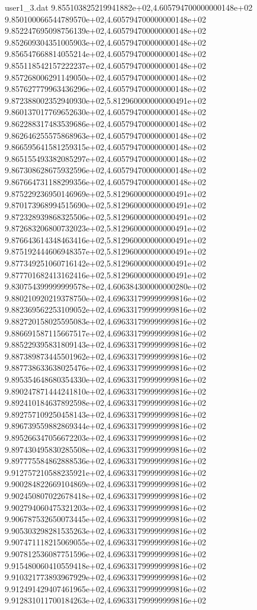 \begin{filecontents}{user1_3.dat}
9.855103825219941882e+02,4.605794700000000148e+02
9.850100066544789570e+02,4.605794700000000148e+02
9.852247695098756139e+02,4.605794700000000148e+02
9.852609304351005903e+02,4.605794700000000148e+02
9.856547668814055214e+02,4.605794700000000148e+02
9.855118542157222237e+02,4.605794700000000148e+02
9.857268006291149050e+02,4.605794700000000148e+02
9.857627779963436296e+02,4.605794700000000148e+02
9.872388002352940930e+02,5.812960000000000491e+02
9.860137017769652630e+02,4.605794700000000148e+02
9.862288317483539686e+02,4.605794700000000148e+02
9.862646255575868963e+02,4.605794700000000148e+02
9.866595641581259315e+02,4.605794700000000148e+02
9.865155493382085297e+02,4.605794700000000148e+02
9.867308628675932596e+02,4.605794700000000148e+02
9.867664731188299356e+02,4.605794700000000148e+02
9.875229236950146969e+02,5.812960000000000491e+02
9.870173968994515690e+02,5.812960000000000491e+02
9.872328939868325506e+02,5.812960000000000491e+02
9.872683206800732023e+02,5.812960000000000491e+02
9.876643614348463416e+02,5.812960000000000491e+02
9.875192444606948357e+02,5.812960000000000491e+02
9.877349251060716142e+02,5.812960000000000491e+02
9.877701682413162416e+02,5.812960000000000491e+02
9.830754399999999578e+02,4.606384300000000280e+02
9.880210920219378750e+02,4.696331799999999816e+02
9.882369562253109052e+02,4.696331799999999816e+02
9.882720158025595083e+02,4.696331799999999816e+02
9.886691587115667517e+02,4.696331799999999816e+02
9.885229395831809143e+02,4.696331799999999816e+02
9.887389873445501962e+02,4.696331799999999816e+02
9.887738633638025476e+02,4.696331799999999816e+02
9.895354648680354330e+02,4.696331799999999816e+02
9.890247871444241810e+02,4.696331799999999816e+02
9.892410184637892598e+02,4.696331799999999816e+02
9.892757109250458143e+02,4.696331799999999816e+02
9.896739559882869344e+02,4.696331799999999816e+02
9.895266347056672203e+02,4.696331799999999816e+02
9.897430495830285508e+02,4.696331799999999816e+02
9.897775584862888536e+02,4.696331799999999816e+02
9.912757210588235921e+02,4.696331799999999816e+02
9.900284822669104869e+02,4.696331799999999816e+02
9.902450807022678418e+02,4.696331799999999816e+02
9.902794060475321203e+02,4.696331799999999816e+02
9.906787532650073445e+02,4.696331799999999816e+02
9.905303298281535263e+02,4.696331799999999816e+02
9.907471118215069055e+02,4.696331799999999816e+02
9.907812536087751596e+02,4.696331799999999816e+02
9.915480060410559418e+02,4.696331799999999816e+02
9.910321773893967929e+02,4.696331799999999816e+02
9.912491429407461965e+02,4.696331799999999816e+02
9.912831011700184263e+02,4.696331799999999816e+02

\end{filecontents}
